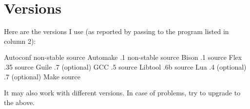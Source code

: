 \section[sct:versions]{Versions}


Here are the versions I use (as reported by passing
 to the program listed in column 2):

\starttabulate[llll]
	   \NC\NR
\HL \NC\NR
\NC \gnu{} Autoconf	\NC {}	  	 		\NC non-stable source \NC\NR
\NC \gnu{} Automake	\NC {} 	 	.1	\NC non-stable source \NC\NR
\NC \gnu{} Bison 		\NC {}  			.1 	\NC source \NC\NR 
\NC Flex						\NC {} 				\NC 2.5.35 	\NC source \NC\NR
\NC \gnu{} Guile		\NC {}				.7 	\NC (optional) \NC\NR
\NC GCC 						\NC {}  				\NC 4.4.5 	\NC source \NC\NR
\NC \gnu{} Libtool	\NC {}  	.6b 	\NC source \NC\NR
\NC \gnu{} Lua			\NC {}  	.4 	\NC (optional) \NC\NR
\NC \libxml{}				\NC {}	.7 	\NC (optional) \NC\NR 
\NC \gnu{} Make			\NC {}			 				\NC source \NC\NR
\stoptabulate

\medskip{}
It may also work with different versions. In case of problems, try to
upgrade to the above.
